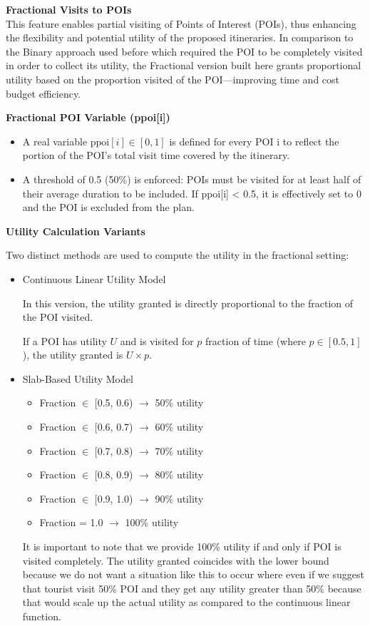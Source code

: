 \documentclass[sigconf,authordraft]{acmart}
\begin{document}
\noindent \textbf{Fractional Visits to POIs}\\
This feature enables partial visiting of Points of Interest (POIs), thus enhancing the flexibility and potential utility of the proposed itineraries. In comparison to the Binary approach used before which required the POI to be completely visited in order to collect its utility, the Fractional version built here grants proportional utility based on the proportion visited of the POI—improving time and cost budget efficiency.

\textbf{Fractional POI Variable (ppoi[i])}
\begin{itemize}
    \item A real variable $\text{ppoi}[i] \in [0, 1]$ is defined for every POI i to reflect the portion of the POI's total visit time covered by the itinerary.

    \item A threshold of 0.5 (50\%) is enforced: POIs must be visited for at least half of their average duration to be included. If ppoi[i] < 0.5, it is effectively set to 0 and the POI is excluded from the plan.
\end{itemize}

\textbf{Utility Calculation Variants}
\label{Utility_Calculation}

Two distinct methods are used to compute the utility in the fractional setting:

\begin{itemize}
\item {Continuous Linear Utility Model}

In this version, the utility granted is directly proportional to the fraction of the POI visited.

If a POI has utility $U$ and is visited for $p$ fraction of time (where $p \in [0.5, 1]$), the utility granted is $U \times p$.

\item{Slab-Based Utility Model}
\begin{itemize}[noitemsep, topsep=0pt]
    \item Fraction $\in$ [0.5, 0.6) $\rightarrow$ 50\% utility
    \item Fraction $\in$ [0.6, 0.7) $\rightarrow$ 60\% utility
    \item Fraction $\in$ [0.7, 0.8) $\rightarrow$ 70\% utility
    \item Fraction $\in$ [0.8, 0.9) $\rightarrow$ 80\% utility
    \item Fraction $\in$ [0.9, 1.0) $\rightarrow$ 90\% utility
    \item Fraction = 1.0 $\rightarrow$ 100\% utility
\end{itemize}

It is important to note that we provide 100\% utility if and only if POI is visited completely. The utility granted coincides with the lower bound because we do not want a situation like this to occur where even if we suggest that tourist visit 50\% POI and they get any utility greater than 50\% because that would scale up the actual utility as compared to the continuous linear function.
\end{itemize}
\end{document}
